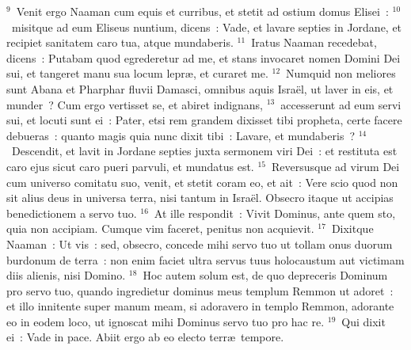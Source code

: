 ${}^{9}$~Venit ergo Naaman cum equis et curribus, et stetit ad ostium domus Elisei~:
${}^{10}$~misitque ad eum Eliseus nuntium, dicens~: Vade, et lavare septies in Jordane, et recipiet sanitatem caro tua, atque mundaberis.
${}^{11}$~Iratus Naaman recedebat, dicens~: Putabam quod egrederetur ad me, et stans invocaret nomen Domini Dei sui, et tangeret manu sua locum lepr\ae , et curaret me.
${}^{12}$~Numquid non meliores sunt Abana et Pharphar fluvii Damasci, omnibus aquis Isra\"el, ut laver in eis, et munder~? Cum ergo vertisset se, et abiret indignans,
${}^{13}$~accesserunt ad eum servi sui, et locuti sunt ei~: Pater, etsi rem grandem dixisset tibi propheta, certe facere debueras~: quanto magis quia nunc dixit tibi~: Lavare, et mundaberis~?
${}^{14}$~Descendit, et lavit in Jordane septies juxta sermonem viri Dei~: et restituta est caro ejus sicut caro pueri parvuli, et mundatus est.
${}^{15}$~Reversusque ad virum Dei cum universo comitatu suo, venit, et stetit coram eo, et ait~: Vere scio quod non sit alius deus in universa terra, nisi tantum in Isra\"el. Obsecro itaque ut accipias benedictionem a servo tuo.
${}^{16}$~At ille respondit~: Vivit Dominus, ante quem sto, quia non accipiam. Cumque vim faceret, penitus non acquievit.
${}^{17}$~Dixitque Naaman~: Ut vis~: sed, obsecro, concede mihi servo tuo ut tollam onus duorum burdonum de terra~: non enim faciet ultra servus tuus holocaustum aut victimam diis alienis, nisi Domino.
${}^{18}$~Hoc autem solum est, de quo depreceris Dominum pro servo tuo, quando ingredietur dominus meus templum Remmon ut adoret~: et illo innitente super manum meam, si adoravero in templo Remmon, adorante eo in eodem loco, ut ignoscat mihi Dominus servo tuo pro hac re.
${}^{19}$~Qui dixit ei~: Vade in pace. Abiit ergo ab eo electo terr\ae\ tempore.


